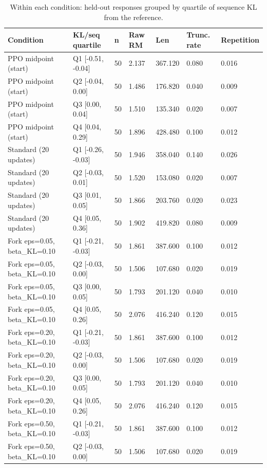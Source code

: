 \begin{table}[t]
\centering
\small
\caption{Within each condition: held-out responses grouped by quartile of sequence KL from the reference.}
\begin{tabular}{lllllll}
\toprule
Condition & KL/seq quartile & n & Raw RM & Len & Trunc. rate & Repetition \\
\midrule
PPO midpoint (start) & Q1 [-0.51, -0.04] & 50 & 2.137 & 367.120 & 0.080 & 0.016 \\
PPO midpoint (start) & Q2 [-0.04, 0.00] & 50 & 1.486 & 176.820 & 0.040 & 0.009 \\
PPO midpoint (start) & Q3 [0.00, 0.04] & 50 & 1.510 & 135.340 & 0.020 & 0.007 \\
PPO midpoint (start) & Q4 [0.04, 0.29] & 50 & 1.896 & 428.480 & 0.100 & 0.012 \\
Standard (20 updates) & Q1 [-0.26, -0.03] & 50 & 1.946 & 358.040 & 0.140 & 0.026 \\
Standard (20 updates) & Q2 [-0.03, 0.01] & 50 & 1.520 & 153.080 & 0.020 & 0.007 \\
Standard (20 updates) & Q3 [0.01, 0.05] & 50 & 1.866 & 203.760 & 0.020 & 0.023 \\
Standard (20 updates) & Q4 [0.05, 0.36] & 50 & 1.902 & 419.820 & 0.080 & 0.009 \\
Fork eps=0.05, beta\_KL=0.10 & Q1 [-0.21, -0.03] & 50 & 1.861 & 387.600 & 0.100 & 0.012 \\
Fork eps=0.05, beta\_KL=0.10 & Q2 [-0.03, 0.00] & 50 & 1.506 & 107.680 & 0.020 & 0.019 \\
Fork eps=0.05, beta\_KL=0.10 & Q3 [0.00, 0.05] & 50 & 1.793 & 201.120 & 0.040 & 0.010 \\
Fork eps=0.05, beta\_KL=0.10 & Q4 [0.05, 0.26] & 50 & 2.076 & 416.240 & 0.120 & 0.015 \\
Fork eps=0.20, beta\_KL=0.10 & Q1 [-0.21, -0.03] & 50 & 1.861 & 387.600 & 0.100 & 0.012 \\
Fork eps=0.20, beta\_KL=0.10 & Q2 [-0.03, 0.00] & 50 & 1.506 & 107.680 & 0.020 & 0.019 \\
Fork eps=0.20, beta\_KL=0.10 & Q3 [0.00, 0.05] & 50 & 1.793 & 201.120 & 0.040 & 0.010 \\
Fork eps=0.20, beta\_KL=0.10 & Q4 [0.05, 0.26] & 50 & 2.076 & 416.240 & 0.120 & 0.015 \\
Fork eps=0.50, beta\_KL=0.10 & Q1 [-0.21, -0.03] & 50 & 1.861 & 387.600 & 0.100 & 0.012 \\
Fork eps=0.50, beta\_KL=0.10 & Q2 [-0.03, 0.00] & 50 & 1.506 & 107.680 & 0.020 & 0.019 \\

\end{tabular}
\end{table}
